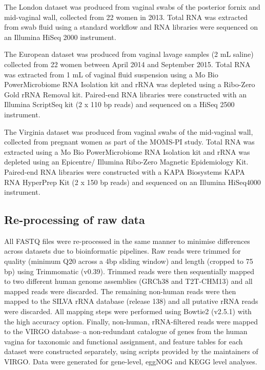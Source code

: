 \documentclass[sn-mathphys,Numbered]{sn-jnl}%
\begin{document}
The London dataset was produced from vaginal swabs of the posterior fornix and mid-vaginal wall, collected from 22 women in 2013. Total RNA was extracted from swab fluid using a standard workflow \citep{Macklaim:2018aa} and RNA libraries were sequenced on an Illumina HiSeq 2000 instrument. 

The European dataset was produced from vaginal lavage samples (2 mL saline) collected from 22 women between April 2014 and September 2015. Total RNA was extracted from 1 mL of vaginal fluid suspension using a Mo Bio PowerMicrobiome RNA Isolation kit and rRNA was depleted using a Ribo-Zero Gold rRNA Removal kit. Paired-end RNA libraries were constructed with an Illumina ScriptSeq kit (2 x 110 bp reads) and sequenced on a HiSeq 2500 instrument.

The Virginia dataset was produced from vaginal swabs of the mid-vaginal wall, collected from pregnant women as part of the MOMS-PI study. Total RNA was extracted using a Mo Bio PowerMicrobiome RNA Isolation kit and rRNA was depleted using an Epicentre/ Illumina Ribo-Zero Magnetic Epidemiology Kit. Paired-end RNA libraries were constructed with a KAPA Biosystems KAPA RNA HyperPrep Kit (2 x 150 bp reads) and sequenced on an Illumina HiSeq4000 instrument.

\subsection{Re-processing of raw data}\label{subsec:subsecReprocessing}
All FASTQ files were re-processed in the same manner to minimise differences across datasets due to bioinformatic pipelines. Raw reads were trimmed for quality (minimum Q20 across a 4bp sliding window) and length (cropped to 75 bp) using Trimmomatic (v0.39). Trimmed reads were then sequentially mapped to two different human genome assemblies (GRCh38 and T2T-CHM13) and all mapped reads were discarded. The remaining non-human reads were then mapped to the SILVA rRNA database (release 138) and all putative rRNA reads were discarded. All mapping steps were performed using Bowtie2 (v2.5.1) with the high accuracy option. Finally, non-human, rRNA-filtered reads were mapped to the VIRGO database--a non-redundant catalogue of genes from the human vagina \cite{Ma:2020aa} for taxonomic and functional assignment, and feature tables for each dataset were constructed separately, using scripts provided by the maintainers of VIRGO. Data were generated for gene-level, eggNOG \cite{Huerta-Cepas:2019uf} and KEGG \cite{Kanehisa:2010} level analyses. 
\end{document}
